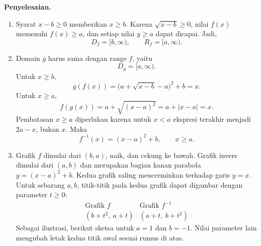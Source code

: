 \documentclass[11pt,a4paper]{article}
\newcommand{\jawab}{\par\medskip\textbf{Penyelesaian.}\par}
\begin{document}
\begin{enumerate}
\jawab
\begin{enumerate}
    \item Syarat $x-b\geq 0$ memberikan $x\geq b$. Karena
    $\sqrt{x-b}\geq 0$, nilai $f(x)$ memenuhi $f(x)\geq a$, dan setiap nilai
    $y\geq a$ dapat dicapai. Jadi,
    \[
        \boxed{D_f=[b,\infty),\qquad R_f=[a,\infty).}
    \]

    \item Domain $g$ harus sama dengan range $f$, yaitu
    \[
        \boxed{D_g=[a,\infty).}
    \]
    Untuk $x\geq b$,
    \[
        g(f(x))=\bigl(a+\sqrt{x-b}-a\bigr)^2+b=x.
    \]
    Untuk $x\geq a$,
    \[
        f(g(x))=a+\sqrt{(x-a)^2}=a+|x-a|=x.
    \]
    Pembatasan $x\geq a$ diperlukan karena untuk $x<a$ ekspresi terakhir
    menjadi $2a-x$, bukan $x$. Maka
    \[
        \boxed{f^{-1}(x)=(x-a)^2+b,\qquad x\geq a.}
    \]

    \item Grafik $f$ dimulai dari $(b,a)$, naik, dan cekung ke bawah.
    Grafik invers dimulai dari $(a,b)$ dan merupakan bagian kanan parabola
    $y=(x-a)^2+b$. Kedua grafik saling mencerminkan terhadap garis $y=x$.
    Untuk sebarang $a,b$, titik-titik pada kedua grafik dapat digambar dengan
    parameter $t\geq 0$:
    \[
        \begin{array}{c|c}
            \text{Grafik }f & \text{Grafik }f^{-1}\\ \hline
            (b+t^2,\ a+t) & (a+t,\ b+t^2)
        \end{array}
    \]
    Sebagai ilustrasi, berikut sketsa untuk $a=1$ dan $b=-1$.
    Nilai parameter lain mengubah letak kedua titik awal sesuai rumus di atas.
    \begin{center}
    \end{center}
\end{enumerate}


\end{enumerate}
\end{document}

